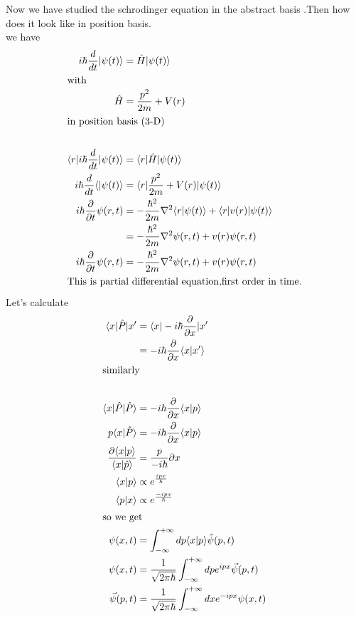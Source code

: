 Now we have studied the schrodinger equation in the abstract basis .Then how does it look like in position basis.\\
we have \\
\begin{align*}
i\hbar \frac{d}{dt}|\psi(t)\rangle &=\hat{H}|\psi(t)\rangle \\
\intertext{with} \hat{H}&=\frac{p^2}{2m}+V(r)\\
\intertext{in position basis (3-D)}\\
\langle r|i\hbar \frac{d}{dt}|\psi(t)\rangle&=\langle r|\hat{H}|\psi(t)\rangle\\
i\hbar \frac{d}{dt}\langle |\psi(t)\rangle&=\langle r|\frac{p^2}{2m}+V(r)|\psi(t)\rangle\\
i\hbar\frac{\partial}{\partial t}\psi(r,t)&=-\frac{\hbar^2}{2m} \nabla^2\langle r|\psi(t)\rangle+\langle r|v(r)|\psi(t)\rangle\\
&=-\frac{\hbar^2}{2m}\nabla^2\psi(r,t)+v(r)\psi(r,t)\\
i\hbar \frac{\partial}{\partial t}\psi(r,t)&=-\frac{\hbar^2}{2m} \nabla^2 \psi(r,t)+v(r)\psi(r,t)\\
\intertext{This is partial differential equation,first order in time.}
\end{align*}
Let's calculate
\begin{align*}
\langle x|\hat{P}|x^{\prime}&=\langle x|-i\hbar \frac{\partial}{\partial x}|x^{\prime}\\
&=-i\hbar \frac{\partial}{\partial x} \langle x|x^{\prime} \rangle\\
\intertext{similarly}\\
\langle x|\hat{P}|\hat{P}\rangle&=-i\hbar \frac{\partial}{\partial x}\langle x|p\rangle\\
p\langle x|\hat{P}\rangle&=-i\hbar\frac{\partial}{\partial x} \langle x|p\rangle\\
\frac{\partial \langle x|p\rangle}{\langle x|\hat{p}\rangle}&=\frac{p}{-i\hbar}\partial x\\
\langle x|p\rangle &\propto e^{\frac{ipx}{\hbar}}\\
\langle p|x\rangle &\propto e^{\frac{-ipx}{\hbar}}\\
\intertext{so we get}
\psi(x,t)&=\int_{-\infty}^{+\infty} dp\langle x|p\rangle \hat{\psi}(p,t)\\
\psi(x,t)&=\frac{1}{\sqrt{2\pi \hbar}}\int_{-\infty}^{+\infty} dp e^{ipx} \vec{\psi}(p,t)\\
\vec{\psi}(p,t)&=\frac{1}{\sqrt{2\pi \hbar}} \int_{-\infty}^{+\infty}dxe^{-ipx} \psi(x,t)\\
\end{align*}
